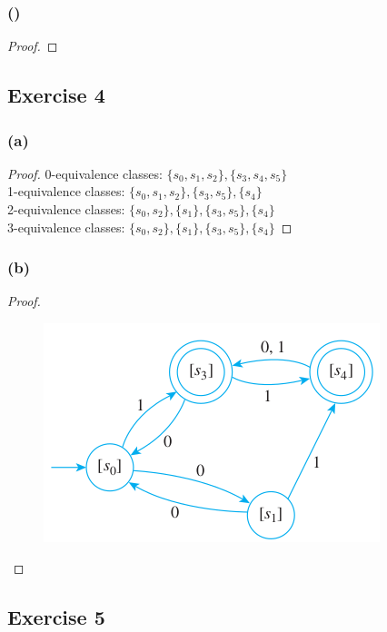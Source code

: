 \documentclass[14pt]{extarticle}
\begin{document}
\subsubsection{()}

\begin{proof}

\end{proof}

\subsection{Exercise 4}

\subsubsection{(a)}

\begin{proof}
0-equivalence classes: \(\{s_0, s_1, s_2\}, \{s_3, s_4, s_5\}\) \\
1-equivalence classes: \(\{s_0, s_1, s_2\}, \{s_3, s_5\}, \{s_4\}\) \\
2-equivalence classes: \(\{s_0, s_2\}, \{s_1\}, \{s_3, s_5\}, \{s_4\}\) \\
3-equivalence classes: \(\{s_0, s_2\}, \{s_1\}, \{s_3, s_5\}, \{s_4\}\)
\end{proof}

\subsubsection{(b)}

\begin{proof}
\begin{figure}[ht!]
\centering
\includegraphics[scale=0.5]{../images/12.3.4.b.png}
\end{figure}
\end{proof}

\subsection{Exercise 5}
\end{document}
